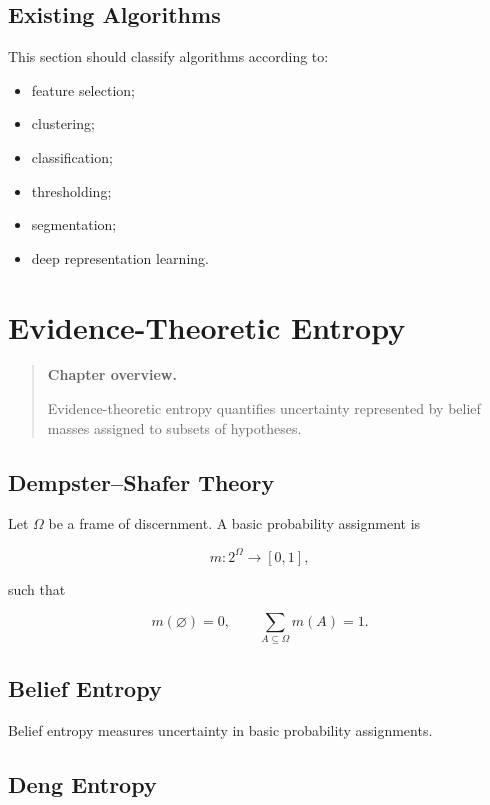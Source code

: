 \documentclass[11pt,oneside]{book}
\theoremstyle{remark}
\newenvironment{chapteroverview}
{
	\begin{quote}
		\small
		\textbf{Chapter overview.}
	}
	{
	\end{quote}
}
\begin{document}
	\section{Existing Algorithms}
	
	This section should classify algorithms according to:
	
	\begin{itemize}
		\item feature selection;
		\item clustering;
		\item classification;
		\item thresholding;
		\item segmentation;
		\item deep representation learning.
	\end{itemize}
	
	
	\chapter{Evidence-Theoretic Entropy}
	\label{chap:evidence-entropy}
	
	\begin{chapteroverview}
		Evidence-theoretic entropy quantifies uncertainty represented by belief masses
		assigned to subsets of hypotheses.
	\end{chapteroverview}
	
	\section{Dempster--Shafer Theory}
	
	Let \(\Omega\) be a frame of discernment. A basic probability assignment is
	
	\[
	m:2^\Omega\rightarrow[0,1],
	\]
	
	such that
	
	\[
	m(\varnothing)=0,
	\qquad
	\sum_{A\subseteq\Omega}m(A)=1.
	\]
	
	\section{Belief Entropy}
	
	Belief entropy measures uncertainty in basic probability assignments.
	
	\section{Deng Entropy}
	
\end{document}

